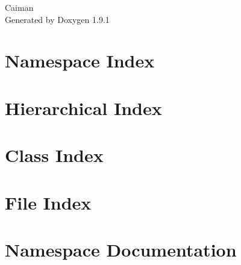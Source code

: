 \let\mypdfximage\pdfximage\def\pdfximage{\immediate\mypdfximage}\documentclass[twoside]{book}
\newcommand{\+}{\discretionary{\mbox{\scriptsize$\hookleftarrow$}}{}{}}
\newcommand{\clearemptydoublepage}{%
  \newpage{\pagestyle{empty}\cleardoublepage}%
}
\begin{document}
\raggedbottom

\hypersetup{pageanchor=false,
             bookmarksnumbered=true,
             pdfencoding=unicode
            }
\begin{titlepage}
\vspace*{7cm}
\begin{center}%
{\Large Caiman }\\
\vspace*{1cm}
{\large Generated by Doxygen 1.9.1}\\
\end{center}
\end{titlepage}
\clearemptydoublepage
{}
\tableofcontents
\clearemptydoublepage
{}
\hypersetup{pageanchor=true}

\chapter{Namespace Index}

\chapter{Hierarchical Index}

\chapter{Class Index}

\chapter{File Index}

\chapter{Namespace Documentation}






\end{document}
